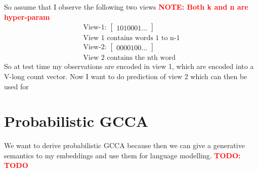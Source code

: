 \documentclass[11pt]{article}
\newcommand{\todo}[1]{\textbf{\textcolor{red}{TODO: #1}}}
\newcommand{\note}[1]{\textbf{\textcolor{red}{NOTE: #1}}}
\begin{document}
So assume that I observe the following two views \note{Both k and n are hyper-param}
\begin{align}
  \text{View-1: }\begin{bmatrix}1 0 1 0 0 0 1 \ldots\end{bmatrix}\\
  \text{View 1 contains words 1 to n-1}\\
  \text{View-2: }\begin{bmatrix}0 0 0 0 1 0 0 \ldots\end{bmatrix}\\
  \text{View 2 contains the nth word}
\end{align}
So at test time my observations are encoded in view 1, which are encoded into a
V-long count vector. Now I want to do prediction of view 2 which can then be used for  
\section{Probabilistic GCCA}
We want to derive probabilistic GCCA because then we can give a generative semantics to my embeddings and use them for language modelling.
\todo{TODO}
\end{document}
